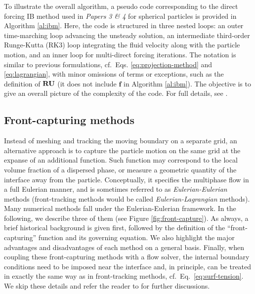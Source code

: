 To illustrate the overall algorithm, a pseudo code corresponding to the direct forcing IB method used in \emph{Papers 3 \& 4} for spherical particles is provided in Algorithm \ref{al:ibm}.
Here, the code is structured in three nested loops:
an outer time-marching loop advancing the unsteady solution,
an intermediate third-order Runge-Kutta (RK3) loop integrating the fluid velocity along with the particle motion,
and an inner loop for multi-direct forcing iterations.
The notation is similar to previous formulations, cf.\ Eqs. \eqref{eq:projection-method} and \eqref{eq:lagrangian}, with minor omissions of terms or exceptions, such as the definition of ${\bf RU}$ (it does not include $\bm f$ in Algorithm \ref{al:ibm}).
The objective is to give an overall picture of the complexity of the code. For full details, see \cite{ Wim-Paul_JCP_2012}.


\subsection{Front-capturing methods}

Instead of meshing and tracking the moving boundary on a separate grid, an alternative approach is to capture the particle motion on the same grid at the expanse of an additional function. Such function may correspond to the local volume fraction of a dispersed phase, or measure a geometric quantity of the interface away from the particle.
Conceptually, it specifies the multiphase flow in a full Eulerian manner, and is sometimes referred to as \emph{Eulerian-Eulerian} methods (front-tracking methods would be called \emph{Eulerian-Lagrangian} methods).
Many numerical methods fall under the Eulerian-Eulerian framework. In the following, we describe three of them (see Figure \ref{fig:front-capture}).
As always, a brief historical background is given first, followed by the definition of the ``front-capturing'' function and its governing equation.
We also highlight the major advantages and disadvantages of each method on a general basis.
Finally, when coupling these front-capturing methods with a flow solver, the internal boundary conditions need to be imposed near the interface and, in principle, can be treated in exactly the same way as in front-tracking methods, cf.\ Eq.\ \eqref{eq:surf-tension}. We skip these details and refer the reader to \cite{Brackbill_JCP_1992, Fedkiw_JCP_1999, Lalanne_JCP_2015, Popinet_ARFM_2018, Gibou_Fedkiv_Osher, ICLS} for further discussions.

